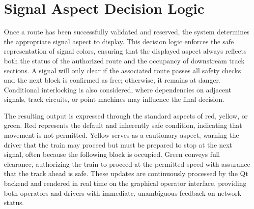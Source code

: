 \section{Signal Aspect Decision Logic}
\label{sec:interlocking:signal-decision}

Once a route has been successfully validated and reserved, the system determines the appropriate signal aspect to display. This decision logic enforces the safe representation of signal colors, ensuring that the displayed aspect always reflects both the status of the authorized route and the occupancy of downstream track sections. A signal will only clear if the associated route passes all safety checks and the next block is confirmed as free; otherwise, it remains at danger. Conditional interlocking is also considered, where dependencies on adjacent signals, track circuits, or point machines may influence the final decision.

The resulting output is expressed through the standard aspects of red, yellow, or green. Red represents the default and inherently safe condition, indicating that movement is not permitted. Yellow serves as a cautionary aspect, warning the driver that the train may proceed but must be prepared to stop at the next signal, often because the following block is occupied. Green conveys full clearance, authorizing the train to proceed at the permitted speed with assurance that the track ahead is safe. These updates are continuously processed by the Qt backend and rendered in real time on the graphical operator interface, providing both operators and drivers with immediate, unambiguous feedback on network status.
